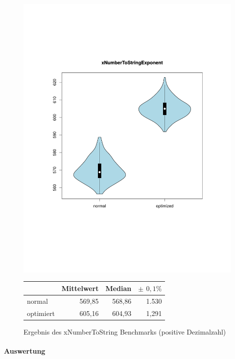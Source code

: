 \begin{figure}[H]
{		\includegraphics[trim=20mm 60mm 0mm 50mm,scale=0.50]{pictures/vioplot_xNumberToStringExponent.pdf}
	}

	\begin{table}[H]
	\centering
		\begin{tabular}{|l|r|r|r|}
			\hline
		   		 	  & Mittelwert & Median & \bf{$\pm$ $0,1\%$} \\
		 	\hline
		 	\hline
		  	normal 	  & 569,85 & 568,86 & 1.530 \\
		 	optimiert & 605,16 & 604,93 & 1,291 \\ 
		  	\hline
		  	
		\end{tabular}
	\end{table}

	\caption{Ergebnis des xNumberToString Benchmarks (positive Dezimalzahl)}\label{bp:instURIBench}
\end{figure}

\paragraph{Auswertung}

